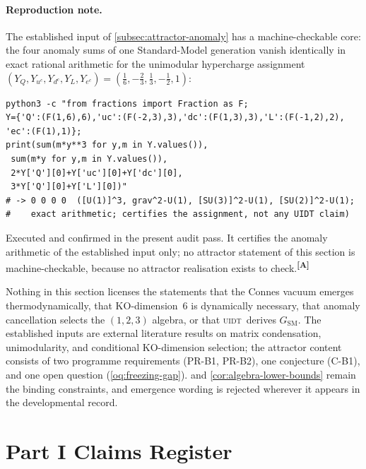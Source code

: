 \documentclass[12pt,a4paper,twoside]{article}
\theoremstyle{plain}
\theoremstyle{definition}
\theoremstyle{remark}
\newcommand{\UIDT}{\textsc{uidt}}
\newcommand{\catmark}[1]{\textsuperscript{\textsf{\textbf{[#1]}}}}
\begin{document}
\paragraph{Reproduction note.}
The established input of \cref{subsec:attractor-anomaly} has a
machine-checkable core: the four anomaly sums of one Standard-Model
generation vanish identically in exact rational arithmetic for the
unimodular hypercharge assignment
$(Y_Q,Y_{u^c},Y_{d^c},Y_L,Y_{e^c})=(\tfrac{1}{6},-\tfrac{2}{3},\tfrac{1}{3},-\tfrac{1}{2},1)$:
\begin{verbatim}
python3 -c "from fractions import Fraction as F;
Y={'Q':(F(1,6),6),'uc':(F(-2,3),3),'dc':(F(1,3),3),'L':(F(-1,2),2),
'ec':(F(1),1)};
print(sum(m*y**3 for y,m in Y.values()),
 sum(m*y for y,m in Y.values()),
 2*Y['Q'][0]+Y['uc'][0]+Y['dc'][0],
 3*Y['Q'][0]+Y['L'][0])"
# -> 0 0 0 0  ([U(1)]^3, grav^2-U(1), [SU(3)]^2-U(1), [SU(2)]^2-U(1);
#    exact arithmetic; certifies the assignment, not any UIDT claim)
\end{verbatim}
Executed and confirmed in the present audit pass. It certifies the
anomaly arithmetic of the established input only; no attractor statement
of this section is machine-checkable, because no attractor realisation
exists to check.\catmark{A}

\begin{governancebox}
Nothing in this section licenses the statements that the Connes vacuum
emerges thermodynamically, that KO-dimension~6 is dynamically necessary,
that anomaly cancellation selects the $(1,2,3)$ algebra, or that \UIDT\
derives $G_{\mathrm{SM}}$. The established inputs are external literature
results on matrix condensation, unimodularity, and conditional
KO-dimension selection; the attractor content consists of two programme
requirements (PR-B1, PR-B2), one conjecture (C-B1), and one open question
(\cref{oq:freezing-gap}). \Cref{thm:gap-localisation} and
\cref{cor:algebra-lower-bounds} remain the binding constraints, and
emergence wording is rejected wherever it appears in the developmental
record.
\end{governancebox}


\section{Part I Claims Register}
\label{sec:part1-claims}
\end{document}
